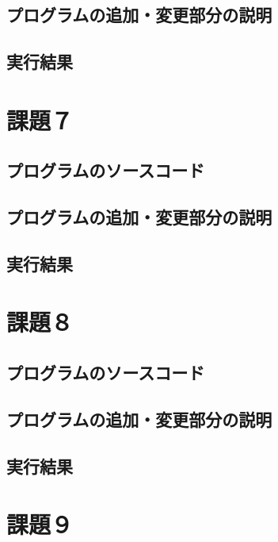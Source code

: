 \documentclass[12pt, xelatex,ja=standard,jafont=hiragino]{bxjsarticle}
\begin{document}
\subsection{プログラムの追加・変更部分の説明}


\subsection{実行結果}







\section{課題７}
\subsection{プログラムのソースコード}


\subsection{プログラムの追加・変更部分の説明}


\subsection{実行結果}







\section{課題８}
\subsection{プログラムのソースコード}


\subsection{プログラムの追加・変更部分の説明}


\subsection{実行結果}





\section{課題９}
\end{document}
